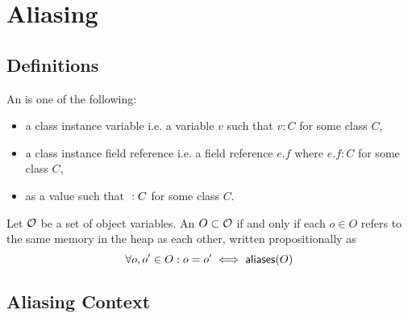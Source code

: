 \section{Aliasing}

\subsection{Definitions}

An  is one of the following:
\begin{itemize}
  \item a class instance variable i.e. a variable $v$ such that $v : C$ for some class $C$,
  \item a class instance field reference i.e. a field reference $e.f$ where $e.f : C$ for some class $C$,
  \item \cnull as a value such that $\null : C$ for some class $C$.
\end{itemize}
Let $\mathcal{O}$ be a set of object variables.
An $O \subset \mathcal{O}$  if and only if
each $o \in O$ refers to the same memory in the heap as each other,
written propositionally as
$$
  \forall o, o^\prime \in O : o = o^\prime \iff \textsf{aliases}(O)
$$

\subsection{Aliasing Context}

